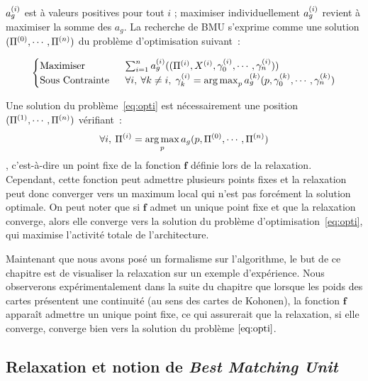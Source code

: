 \documentclass[../main]{subfiles}
\begin{document}
$a_g^{({i})}$ est à valeurs positives pour tout $i$ ; maximiser individuellement $a_g^{({i})}$ revient à maximiser la somme des $a_g$. 
La recherche de BMU s'exprime comme une solution $(\Pi^{({0})}, \cdots, \Pi^{({n})})$ du problème d'optimisation suivant~:

\begin{equation}\label{eq:opti}
	\begin{cases}
	\text{Maximiser}\;& \sum_{i = 1}^n a_g^{({i})}((\Pi^{({i})},X^{({i})},\gamma_0^{({i})}, \cdots, \gamma_n^{({i})})) \\
	\text{Sous Contrainte }\; &\forall i,\:\forall k \neq i, \; \gamma_k^{({i})} = \operatorname*{arg\,max}_{p}a_g^{({k})}(p,\gamma_0^{({k})}, \cdots, \gamma_n^{({k})})
	\end{cases}
\end{equation}

Une solution du problème~\ref{eq:opti} est nécessairement une position $(\Pi^{({1})}, \cdots, \Pi^{({n})})$ vérifiant~:
$$\forall i, \: \Pi^{({i})} = \operatorname*{arg\,max}_p a_g(p, \Pi^{({0})}, \cdots, \Pi^{({n})})$$, c'est-à-dire un point fixe de la fonction $\mathbf{f}$ définie lors de la relaxation.
Cependant, cette fonction peut admettre plusieurs points fixes et la relaxation peut donc converger vers un maximum local qui n'est pas forcément la solution optimale.
On peut noter que si $\mathbf{f}$ admet un unique point fixe et que la relaxation converge, alors elle converge vers la solution du problème d'optimisation~\ref{eq:opti}, qui maximise l'activité totale de l'architecture.

Maintenant que nous avons posé un formalisme sur l'algorithme, le but de ce chapitre est de visualiser la relaxation sur un exemple d'expérience.
Nous observerons expérimentalement dans la suite du chapitre que lorsque les poids des cartes présentent une continuité (au sens des cartes de Kohonen), la fonction $\mathbf{f}$ apparaît admettre un unique point fixe, ce qui assurerait que la relaxation, si elle converge, converge bien vers la solution du problème $\ref{eq:opti}$.

\subsection{Relaxation et notion de \emph{Best Matching Unit}}
\end{document}
